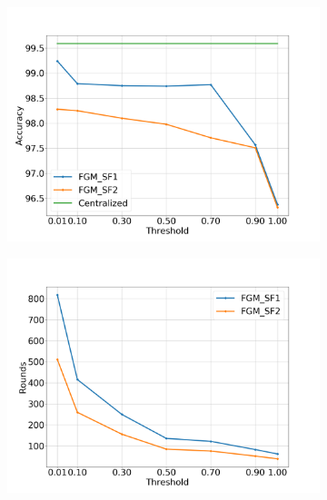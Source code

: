 \begin{figure}[H]
    \centering
    \begin{subfigure}[b]{0.48\textwidth}
        \includegraphics[width=\textwidth]{./images/results/sf-comp/exp_Fig_1_1.png}
        \caption{}
    \end{subfigure}
    \begin{subfigure}[b]{0.48\textwidth}
        \includegraphics[width=\textwidth]{./images/results/sf-comp/exp_Fig_1_2.png}
        \caption{}
    \end{subfigure}
    \begin{subfigure}[b]{0.50\textwidth}

\end{subfigure}
\end{figure}
